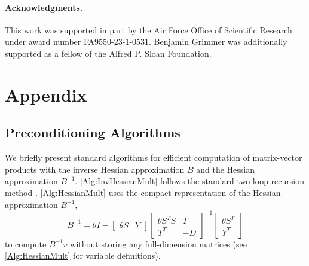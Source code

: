 \documentclass[11pt]{article}
\numberwithin{equation}{section}
\theoremstyle{definition}
\theoremstyle{plain}
\theoremstyle{definition}
\begin{document}
    \paragraph{Acknowledgments.} This work was supported in part by the Air Force Office of Scientific Research under award number FA9550-23-1-0531. Benjamin Grimmer was additionally supported as a fellow of the Alfred P. Sloan Foundation.

    {\small
    
    
    }

    \appendix
\section{Appendix} \label{Sec:Appendix}


\subsection{Preconditioning Algorithms} \label{SubSec:PreconditioningAlgs}

We briefly present standard algorithms for efficient computation of matrix-vector products with the inverse Hessian approximation $B$ and the Hessian approximation $B^{-1}$. \cref{Alg:InvHessianMult} follows the standard two-loop recursion method \cite{LBFGS_Nocedal}. \cref{Alg:HessianMult} uses the compact representation \cite{ByrdNocedal_1994} of the Hessian approximation $B^{-1}$,
\begin{equation*}
    B^{-1} = \theta I - \begin{bmatrix} \theta S & Y \end{bmatrix} \begin{bmatrix} \theta S^T S & T \\ T^T & -D \end{bmatrix}^{-1} \begin{bmatrix} \theta S^T \\ Y^T \end{bmatrix}
\end{equation*}
to compute $B^{-1} v$ without storing any full-dimension matrices (see \cref{Alg:HessianMult} for variable definitions).
\end{document}
